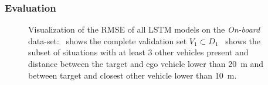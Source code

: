 \subsubsection{Evaluation}%
\label{ssubsec:evaluation_lstms}

\begin{figure}[t!]
	\centering
    \caption{Visualization of the \ac{RMSE} of all \ac{LSTM} models on the \emph{On-board} data-set:~\protect{} shows the complete validation set $V_1 \subset D_1$~\protect{} shows the subset of situations with at least \num{3} other vehicles present and distance between the target and ego vehicle lower than  \SI{20}{\meter} and between target and closest other vehicle lower than \SI{10}{\meter}.}\label{fig:rmse_on_board_all}
\end{figure}

